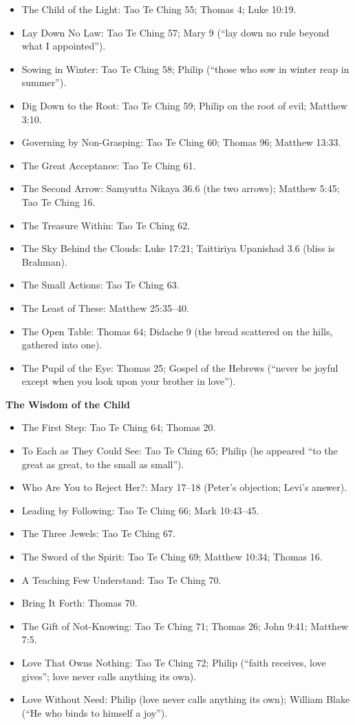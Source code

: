 \documentclass[10pt, openright]{book}
\providecommand{\tightlist}{\setlength{\itemsep}{0pt}\setlength{\parskip}{0pt}}
\begin{document}
\begin{itemize}
\tightlist
\item
  The Child of the Light: Tao Te Ching 55; Thomas 4; Luke 10:19.
\item
  Lay Down No Law: Tao Te Ching 57; Mary 9 (``lay down no rule beyond
  what I appointed'').
\item
  Sowing in Winter: Tao Te Ching 58; Philip (``those who sow in winter
  reap in summer'').
\item
  Dig Down to the Root: Tao Te Ching 59; Philip on the root of evil;
  Matthew 3:10.
\item
  Governing by Non-Grasping: Tao Te Ching 60; Thomas 96; Matthew 13:33.
\item
  The Great Acceptance: Tao Te Ching 61.
\item
  The Second Arrow: Samyutta Nikaya 36.6 (the two arrows); Matthew 5:45;
  Tao Te Ching 16.
\item
  The Treasure Within: Tao Te Ching 62.
\item
  The Sky Behind the Clouds: Luke 17:21; Taittiriya Upanishad 3.6 (bliss
  is Brahman).
\item
  The Small Actions: Tao Te Ching 63.
\item
  The Least of These: Matthew 25:35--40.
\item
  The Open Table: Thomas 64; Didache 9 (the bread scattered on the
  hills, gathered into one).
\item
  The Pupil of the Eye: Thomas 25; Gospel of the Hebrews (``never be
  joyful except when you look upon your brother in love'').
\end{itemize}

\textbf{The Wisdom of the Child}

\begin{itemize}
\tightlist
\item
  The First Step: Tao Te Ching 64; Thomas 20.
\item
  To Each as They Could See: Tao Te Ching 65; Philip (he appeared ``to
  the great as great, to the small as small'').
\item
  Who Are You to Reject Her?: Mary 17--18 (Peter's objection; Levi's
  answer).
\item
  Leading by Following: Tao Te Ching 66; Mark 10:43--45.
\item
  The Three Jewels: Tao Te Ching 67.
\item
  The Sword of the Spirit: Tao Te Ching 69; Matthew 10:34; Thomas 16.
\item
  A Teaching Few Understand: Tao Te Ching 70.
\item
  Bring It Forth: Thomas 70.
\item
  The Gift of Not-Knowing: Tao Te Ching 71; Thomas 26; John 9:41;
  Matthew 7:5.
\item
  Love That Owns Nothing: Tao Te Ching 72; Philip (``faith receives,
  love gives''; love never calls anything its own).
\item
  Love Without Need: Philip (love never calls anything its own); William
  Blake (``He who binds to himself a joy'').
\end{itemize}
\end{document}
